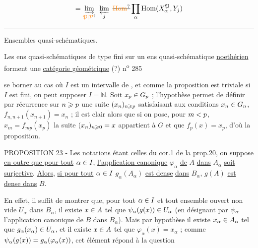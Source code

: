 \[
= \varinjlim_{\unsure{\mathfrak P|\mathcal P}}\ \varprojlim_j\
\deleted{\unsure{\operatorname{Hom}}}\prod_\alpha
\operatorname{Hom}(X_\alpha^{\mathfrak P},Y_j)
\]

\begin{center}\rule{1.4cm}{0.4pt}\end{center}

\noindent\llap{\raisebox{-1.1ex}{\rule{0.35pt}{2.4ex}}\hspace{.35em}}Ensembles quasi-schématiques.

Les ens quasi-schématiques de type fini sur un  ens quasi-schématique \uline{noethérien} forment une \uline{catégorie géométrique} (?)
\hfill n\textsuperscript{o} 285

se borner au cas où $I$ est un intervalle de \hspace{1.2em}, et comme la proposition
est triviale si $I$ est fini, on peut supposer $I=\mathbb{N}$. Soit $x_p\in G_p$ ;
l'hypothèse permet de définir par récurrence sur $n\geqslant p$ une suite $(x_n)_{n\geqslant p}$
satisfaisant aux conditions $x_n\in G_n$, $f_{n,n+1}(x_{n+1})=x_n$ ; il est clair
alors que si on pose, pour $m<p$, $x_m=f_{mp}(x_p)$ la suite $(x_n)_{n\geqslant0}=x$
appartient à $G$ et que $f_p(x)=x_p$, d'où la proposition.

PROPOSITION 23 - \uline{Les notations étant celles du cor}.1 \uline{de la prop.}20,
\uline{on suppose en outre que pour tout} $\alpha\in I$, \uline{l'application canonique} $\varphi_\alpha$ \uline{de} $A$
\uline{dans} $A_\alpha$ \uline{soit surjective}. \uline{Alors}, \uline{si pour tout} $\alpha\in I$ $g_\alpha(A_\alpha)$ \uline{est dense}
\uline{dans} $B_\alpha$, $g(A)$ \uline{est dense dans} $B$.

En effet, il suffit de montrer que, pour tout $\alpha\in I$ et tout ensemble
ouvert non vide $U_\alpha$ dans $B_\alpha$, il existe $x\in A$ tel que $\psi_\alpha(g(x))\in U_\alpha$ (en
désignant par $\psi_\alpha$ l'application canonique de $B$ dans $B_\alpha$). Mais par hypothèse
il existe $x_\alpha\in A_\alpha$ tel que $g_\alpha(x_\alpha)\in U_\alpha$, et il existe $x\in A$ tel que
$\varphi_\alpha(x)=x_\alpha$ ; comme $\psi_\alpha(g(x))=g_\alpha(\varphi_\alpha(x))$, cet élément répond à la question

